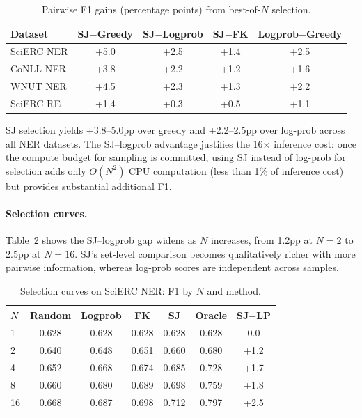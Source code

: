 \documentclass[11pt,a4paper]{article}
\begin{document}
\begin{table}[t]
\centering
\small
\caption{Pairwise F1 gains (percentage points) from best-of-$N$ selection.}
\label{tab:f1gains}
\begin{tabular}{lcccc}
\toprule
\textbf{Dataset} & \textbf{SJ$-$Greedy} & \textbf{SJ$-$Logprob} & \textbf{SJ$-$FK} & \textbf{Logprob$-$Greedy} \\
\midrule
SciERC NER & +5.0 & +2.5 & +1.4 & +2.5 \\
CoNLL NER  & +3.8 & +2.2 & +1.2 & +1.6 \\
WNUT NER   & +4.5 & +2.3 & +1.3 & +2.2 \\
SciERC RE  & +1.4 & +0.3 & +0.5 & +1.1 \\
\bottomrule
\end{tabular}
\end{table}

SJ selection yields +3.8--5.0pp over greedy and +2.2--2.5pp over log-prob across all NER datasets. The SJ--logprob advantage justifies the 16$\times$ inference cost: once the compute budget for sampling is committed, using SJ instead of log-prob for selection adds only $O(N^2)$ CPU computation (less than 1\% of inference cost) but provides substantial additional F1.

\paragraph{Selection curves.}
Table~\ref{tab:selcurve} shows the SJ--logprob gap widens as $N$ increases, from 1.2pp at $N{=}2$ to 2.5pp at $N{=}16$. SJ's set-level comparison becomes qualitatively richer with more pairwise information, whereas log-prob scores are independent across samples.

\begin{table}[t]
\centering
\small
\caption{Selection curves on SciERC NER: F1 by $N$ and method.}
\label{tab:selcurve}
\begin{tabular}{lcccccc}
\toprule
\textbf{$N$} & \textbf{Random} & \textbf{Logprob} & \textbf{FK} & \textbf{SJ} & \textbf{Oracle} & \textbf{SJ$-$LP} \\
\midrule
1  & 0.628 & 0.628 & 0.628 & 0.628 & 0.628 & 0.0 \\
2  & 0.640 & 0.648 & 0.651 & 0.660 & 0.680 & +1.2 \\
4  & 0.652 & 0.668 & 0.674 & 0.685 & 0.728 & +1.7 \\
8  & 0.660 & 0.680 & 0.689 & 0.698 & 0.759 & +1.8 \\
16 & 0.668 & 0.687 & 0.698 & 0.712 & 0.797 & +2.5 \\
\bottomrule
\end{tabular}
\end{table}
\end{document}
